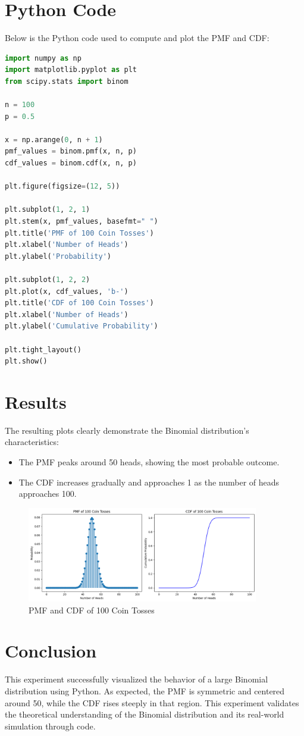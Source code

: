 \documentclass[12pt]{article}
\begin{document}
\section{Python Code}
Below is the Python code used to compute and plot the PMF and CDF:

\begin{lstlisting}[language=Python]
import numpy as np
import matplotlib.pyplot as plt
from scipy.stats import binom

n = 100
p = 0.5

x = np.arange(0, n + 1)
pmf_values = binom.pmf(x, n, p)
cdf_values = binom.cdf(x, n, p)

plt.figure(figsize=(12, 5))

plt.subplot(1, 2, 1)
plt.stem(x, pmf_values, basefmt=" ")
plt.title('PMF of 100 Coin Tosses')
plt.xlabel('Number of Heads')
plt.ylabel('Probability')

plt.subplot(1, 2, 2)
plt.plot(x, cdf_values, 'b-')
plt.title('CDF of 100 Coin Tosses')
plt.xlabel('Number of Heads')
plt.ylabel('Cumulative Probability')

plt.tight_layout()
plt.show()
\end{lstlisting}

\section{Results}
The resulting plots clearly demonstrate the Binomial distribution's characteristics:
\begin{itemize}
    \item The PMF peaks around 50 heads, showing the most probable outcome.
    \item The CDF increases gradually and approaches 1 as the number of heads approaches 100.
\end{itemize}

\begin{figure}[h]
\centering
\includegraphics[width=0.9\textwidth]{cdf_pmf_plot.png}
\caption{PMF and CDF of 100 Coin Tosses}
\end{figure}

\section{Conclusion}
This experiment successfully visualized the behavior of a large Binomial distribution using Python. As expected, the PMF is symmetric and centered around 50, while the CDF rises steeply in that region. This experiment validates the theoretical understanding of the Binomial distribution and its real-world simulation through code.
\end{document}
